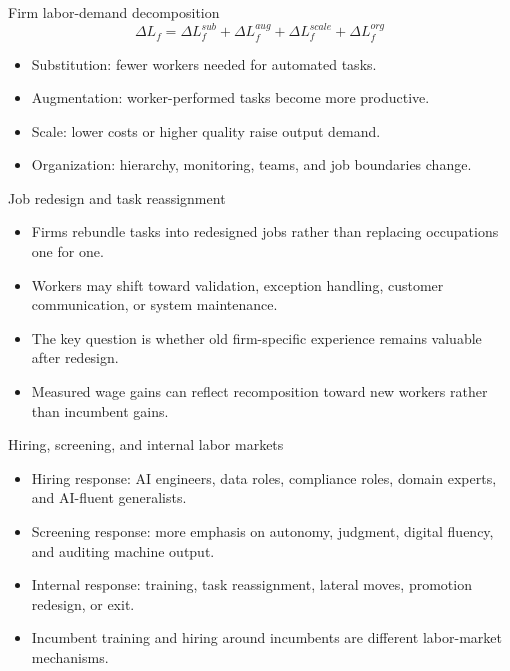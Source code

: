\documentclass[aspectratio=169,11pt]{beamer}
\begin{document}
\begin{frame}{Firm labor-demand decomposition}
\[
\Delta L_f =
\Delta L_f^{sub}
+ \Delta L_f^{aug}
+ \Delta L_f^{scale}
+ \Delta L_f^{org}
\]
\begin{itemize}
    \item Substitution: fewer workers needed for automated tasks.
    \item Augmentation: worker-performed tasks become more productive.
    \item Scale: lower costs or higher quality raise output demand.
    \item Organization: hierarchy, monitoring, teams, and job boundaries change.
\end{itemize}
\end{frame}

\begin{frame}{Job redesign and task reassignment}
\begin{itemize}
    \item Firms rebundle tasks into redesigned jobs rather than replacing occupations one for one.
    \item Workers may shift toward validation, exception handling, customer communication, or system maintenance.
    \item The key question is whether old firm-specific experience remains valuable after redesign.
    \item Measured wage gains can reflect recomposition toward new workers rather than incumbent gains.
\end{itemize}
\end{frame}

\begin{frame}{Hiring, screening, and internal labor markets}
\begin{itemize}
    \item Hiring response: AI engineers, data roles, compliance roles, domain experts, and AI-fluent generalists.
    \item Screening response: more emphasis on autonomy, judgment, digital fluency, and auditing machine output.
    \item Internal response: training, task reassignment, lateral moves, promotion redesign, or exit.
    \item Incumbent training and hiring around incumbents are different labor-market mechanisms.
\end{itemize}
\end{frame}
\end{document}
